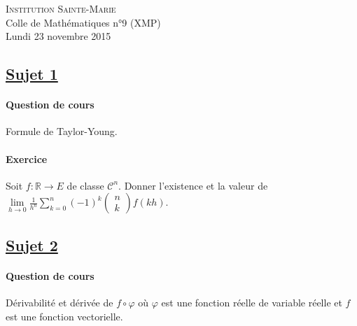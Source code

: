 \documentclass[12pt,a4paper]{report}
\begin{document}
\newcommand{\rA}{\mathcal{A}}
\newcommand{\rB}{\mathcal{B}}
\newcommand{\rC}{\mathcal{C}}
\newcommand{\rG}{\mathcal{G}}
\newcommand{\rF}{\mathcal{F}}
\newcommand{\rO}{\mathcal{O}}
\newcommand{\rP}{\mathcal{P}}
\newcommand{\rH}{\mathcal{H}}
\newcommand{\rR}{\mathcal{R}}
\newcommand{\rE}{\mathcal{E}}
\newcommand{\rL}{\mathcal{L}}
\newcommand{\rM}{\mathcal{M}}
\newcommand{\bK}{\mathbb{K}}
\newcommand{\bQ}{\mathbb{Q}}
\newcommand{\bR}{\mathbb{R}}
\newcommand{\bZ}{\mathbb{Z}}
\newcommand{\bN}{\mathbb{N}}
\newcommand{\bC}{\mathbb{C}}
\newcommand{\bP}{\mathbb{P}}
\newcommand{\bF}{\mathbb{F}}

\ifpdf
{}
\else
{}
\fi

\pagestyle{empty} %

\noindent \textsc{Institution Sainte-Marie}\\
Colle de Mathématiques n°9 (XMP)\\
Lundi 23 novembre 2015


\subsection*{\underline{Sujet 1}}

\paragraph*{Question de cours}
Formule de Taylor-Young.

\paragraph*{Exercice}
Soit $f : \bR \rightarrow E$ de classe $\rC^n$. Donner l'existence et la valeur de 
$\lim\limits_{h\rightarrow 0}\frac{1}{h^n}\sum\limits_{k=0}^n(-1)^k\begin{pmatrix} n\\ k \end{pmatrix}f(kh).$

\subsection*{\underline{Sujet 2}}

\paragraph*{Question de cours}
Dérivabilité et dérivée de $f\circ\varphi$ où $\varphi$ est une fonction réelle de variable réelle et $f$ est une fonction vectorielle.
\end{document}
